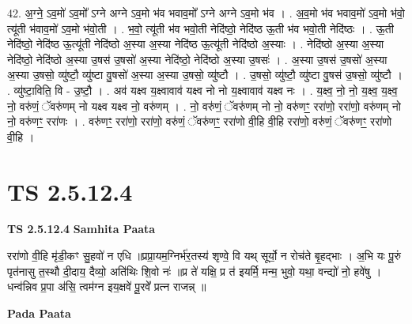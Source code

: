 \documentclass[17pt]{extarticle}
\begin{document}
42. अ॒ग्ने॒ ऽव॒मो॑ ऽव॒मो᳚ ऽग्ने अग्ने ऽव॒मो भ॑व भवाव॒मो᳚ ऽग्ने अग्ने ऽव॒मो भ॑व । . अ॒व॒मो भ॑व भवाव॒मो॑ ऽव॒मो भ॑वो॒ त्यू॑ती भ॑वाव॒मो॑ ऽव॒मो भ॑वो॒ती । . भ॒वो॒ त्यू॑ती भ॑व भवो॒ती नेदि॑ष्ठो॒ नेदि॑ष्ठ ऊ॒ती भ॑व भवो॒ती नेदि॑ष्ठः । . ऊ॒ती नेदि॑ष्ठो॒ नेदि॑ष्ठ ऊ॒त्यू॑ती नेदि॑ष्ठो अ॒स्या अ॒स्या नेदि॑ष्ठ ऊ॒त्यू॑ती नेदि॑ष्ठो अ॒स्याः । . नेदि॑ष्ठो अ॒स्या अ॒स्या नेदि॑ष्ठो॒ नेदि॑ष्ठो अ॒स्या उ॒षस॑ उ॒षसो॑ अ॒स्या नेदि॑ष्ठो॒ नेदि॑ष्ठो अ॒स्या उ॒षसः॑ । . अ॒स्या उ॒षस॑ उ॒षसो॑ अ॒स्या अ॒स्या उ॒षसो॒ व्यु॑ष्टौ॒ व्यु॑ष्टा वु॒षसो॑ अ॒स्या अ॒स्या उ॒षसो॒ व्यु॑ष्टौ । . उ॒षसो॒ व्यु॑ष्टौ॒ व्यु॑ष्टा वु॒षस॑ उ॒षसो॒ व्यु॑ष्टौ । . व्यु॑ष्टा॒विति॒ वि - उ॒ष्टौ॒ । . अव॑ यक्ष्व य॒क्ष्वावाव॑ यक्ष्व नो नो य॒क्ष्वावाव॑ यक्ष्व नः । . य॒क्ष्व॒ नो॒ नो॒ य॒क्ष्व॒ य॒क्ष्व॒ नो॒ वरु॑णं॒ ॅवरु॑णम् नो यक्ष्व यक्ष्व नो॒ वरु॑णम् । . नो॒ वरु॑णं॒ ॅवरु॑णम् नो नो॒ वरु॑णꣳ॒॒ ररा॑णो॒ ररा॑णो॒ वरु॑णम् नो नो॒ वरु॑णꣳ॒॒ ररा॑णः । . वरु॑णꣳ॒॒ ररा॑णो॒ ररा॑णो॒ वरु॑णं॒ ॅवरु॑णꣳ॒॒ ररा॑णो वी॒हि वी॒हि ररा॑णो॒ वरु॑णं॒ ॅवरु॑णꣳ॒॒ ररा॑णो वी॒हि । \newline
\pagebreak
{}
\section*{ TS 2.5.12.4 }

\textbf{TS 2.5.12.4 } \newline
\textbf{Samhita Paata} \newline

ररा॑णो वी॒हि मृ॑डी॒कꣳ सु॒हवो॑ न एधि ॥प्रप्रा॒यम॒ग्निर्भ॑र॒तस्य॑ शृण्वे॒ वि यथ् सूर्यो॒ न रोच॑ते बृ॒हद्भाः । अ॒भि यः पू॒रुं पृत॑नासु त॒स्थौ दी॒दाय॒ दैव्यो॒ अति॑थिः शि॒वो नः॑ ॥प्र ते॑ यक्षि॒ प्र त॑ इयर्मि॒ मन्म॒ भुवो॒ यथा॒ वन्द्यो॑ नो॒ हवे॑षु । धन्व॑न्निव प्र॒पा अ॑सि॒ त्वम॑ग्न इय॒क्षवे॑ पू॒रवे᳚ प्रत्न राजन्न् ॥ \newline

\textbf{Pada Paata} \newline
\end{document}
